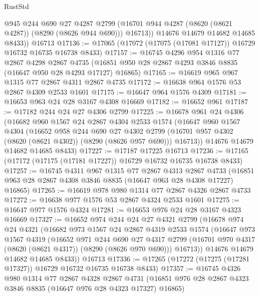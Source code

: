 \begin{lexlean}{RustStd}
\begin{coremodule}
            @945
            @244
            @690
            @27
            @4287
            @2799
            (@16701 @944 @4287 (@8620 (@8621 @4287)) (@8290 (@8626 @944 @690)))
            @16713))
        @14676
        @14679
        @14682
        @14685
        @8433))
    @16713
@17136 := @17065 (@17072 (@17075 (@17081 @17127)) @16729 @16732 @16735 @16738 @8433)
@17157 := @16745
    @4296
    @954
    @1316
    @77
    @2867
    @4298
    @2867
    @4735
    (@16851 @950 @28 @2867 @4293 @3846 @8835 (@16647 @950 @28 @4293 @17127) @16865)
@17165 := @16619 @965 @967 @1315 @77 @2867 @4311 @2867 @4735
@17172 := @16638 @964 @1576 @53 @2867 @4309 @2533 @1601
@17175 := @16647 @964 @1576 @4309
@17181 := @16653 @963 @24 @28 @3167 @4308 @16669
@17182 := @16652 @961
@17187 := @17182 @244 @24 @27 @4306 @2799
@17225 := @16678
    @961
    @24
    @4306
    (@16682
      @960
      @1567
      @24
      @2867
      @4304
      @2533
      @1574
      (@16647
        @960
        @1567
        @4304
        (@16652
          @958
          @244
          @690
          @27
          @4302
          @2799
          (@16701 @957 @4302 (@8620 (@8621 @4302)) (@8290 (@8626 @957 @690)))
          @16713))
      @14676
      @14679
      @14682
      @14685
      @8433)
@17227 := @17187 @17225 @16713
@17236 := @17165 (@17172 (@17175 (@17181 @17227)) @16729 @16732 @16735 @16738 @8433)
@17257 := @16745
    @4311
    @967
    @1315
    @77
    @2867
    @4313
    @2867
    @4733
    (@16851 @963 @28 @2867 @4308 @3846 @8835 (@16647 @963 @28 @4308 @17227) @16865)
@17265 := @16619 @978 @980 @1314 @77 @2867 @4326 @2867 @4733
@17272 := @16638 @977 @1576 @53 @2867 @4324 @2533 @1601
@17275 := @16647 @977 @1576 @4324
@17281 := @16653 @976 @24 @28 @3167 @4323 @16669
@17327 := @16652
    @974
    @244
    @24
    @27
    @4321
    @2799
    (@16678
      @974
      @24
      @4321
      (@16682
        @973
        @1567
        @24
        @2867
        @4319
        @2533
        @1574
        (@16647
          @973
          @1567
          @4319
          (@16652
            @971
            @244
            @690
            @27
            @4317
            @2799
            (@16701 @970 @4317 (@8620 (@8621 @4317)) (@8290 (@8626 @970 @690)))
            @16713))
        @14676
        @14679
        @14682
        @14685
        @8433))
    @16713
@17336 := @17265 (@17272 (@17275 (@17281 @17327)) @16729 @16732 @16735 @16738 @8433)
@17357 := @16745
    @4326
    @980
    @1314
    @77
    @2867
    @4328
    @2867
    @4731
    (@16851 @976 @28 @2867 @4323 @3846 @8835 (@16647 @976 @28 @4323 @17327) @16865)

\end{coremodule}
\end{lexlean}
